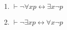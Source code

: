\documentclass[
    mode=hazy,
    color=blue,
    device=normal,
    lang=cn
]{elegantnote}
\begin{document}
        \begin{proposition}
            \hfill
            \begin{enumerate}[label = $\arabic*^\circ$]
                \item $\vdash \lnot \forall x p\leftrightarrow \exists x\lnot p$
                \item $\vdash \lnot \exists x p\leftrightarrow \forall x\lnot p$
            \end{enumerate}
        \end{proposition}
\end{document}
